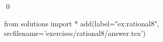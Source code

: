
\begin{ex} 
  \label{ex:rational8}
  
  \qed
\end{ex} 
\begin{python0}
from solutions import *
add(label="ex:rational8",
    srcfilename='exercises/rational8/answer.tex') 
\end{python0}
